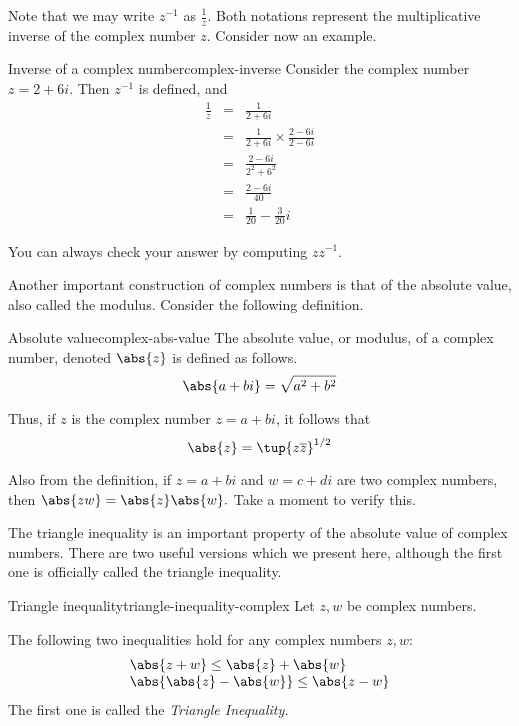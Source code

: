 Note that we may write $z^{-1}$ as $\frac{1}{z}$. Both notations represent the multiplicative inverse of the complex number $z$. Consider now an example.

\begin{example}{Inverse of a complex number}{complex-inverse}
Consider the complex number $z = 2 + 6i$. Then $z^{-1}$ is defined, and
\begin{eqnarray*}
 \frac{1}{z} &=& \frac{1}{2+6i}\\
 &=& \frac{1}{2+6i}\times \frac{2-6i}{2-6i} \\
 &=& \frac{2-6i}{2^2+6^2} \\
 &=& \frac{2-6i}{40} \\
 &=& \frac{1}{20} -  \frac{3}{20}i
\end{eqnarray*}

You can always check your answer by computing $zz^{-1}$.
\end{example}

Another important construction of complex numbers is that of the absolute value, also called the modulus. Consider the following definition. 

\begin{definition}{Absolute value}{complex-abs-value}
%
The absolute
value, or modulus, of a complex number, denoted $\abs{z}$ is defined as follows.
\begin{equation*}
\abs{a+bi} =
\sqrt{a^{2}+b^{2}}
\end{equation*}
\end{definition}

Thus, if $z$ is the complex number $z=a+bi$, it follows that
\begin{equation*}
\abs{z} =\tup{z\overline{z}} ^{1/2}
\end{equation*}

Also from the definition, if $z=a+bi$ and $w=c+di$ are two complex numbers,
then $\abs{zw}=\abs{z}\abs{w}.$ Take a moment to verify this.

The triangle inequality is an important property of the absolute value
of complex numbers. There are two useful versions which we present
here, although the first one is officially called the triangle inequality. 

\begin{proposition}{Triangle inequality}{triangle-inequality-complex}
Let $z,w$ be complex numbers. 

The following two inequalities hold for any  complex numbers $z,w$:
\begin{equation*}
\begin{array}{l}
\abs{z+w} \leq \abs{z} +\abs{w}  \\
\abs{\abs{z} -\abs{w}} \leq \abs{z-w} 
\end{array}
\end{equation*}
The first one is called the \em{Triangle Inequality}.
\end{proposition}

